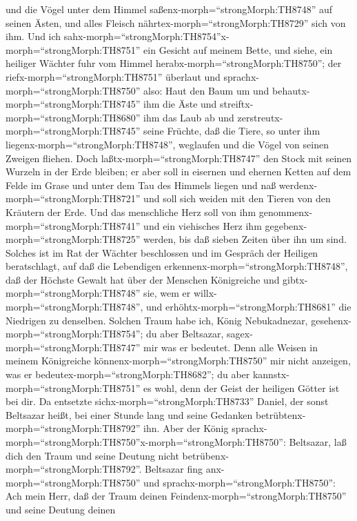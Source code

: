 und die Vögel unter dem Himmel saßenx-morph=``strongMorph:TH8748'' auf
seinen Ästen, und alles Fleisch nährtex-morph=``strongMorph:TH8729''
sich von ihm.  Und ich
sahx-morph=``strongMorph:TH8754''x-morph=``strongMorph:TH8751'' ein
Gesicht auf meinem Bette, und siehe, ein heiliger Wächter fuhr vom
Himmel herabx-morph=``strongMorph:TH8750'';  der
riefx-morph=``strongMorph:TH8751'' überlaut und
sprachx-morph=``strongMorph:TH8750'' also: Haut den Baum um und
behautx-morph=``strongMorph:TH8745'' ihm die Äste und
streiftx-morph=``strongMorph:TH8680'' ihm das Laub ab und
zerstreutx-morph=``strongMorph:TH8745'' seine Früchte, daß die Tiere, so
unter ihm liegenx-morph=``strongMorph:TH8748'', weglaufen und die Vögel
von seinen Zweigen fliehen.  Doch
laßtx-morph=``strongMorph:TH8747'' den Stock mit seinen Wurzeln in der
Erde bleiben; er aber soll in eisernen und ehernen Ketten auf dem Felde
im Grase und unter dem Tau des Himmels liegen und naß
werdenx-morph=``strongMorph:TH8721'' und soll sich weiden mit den Tieren
von den Kräutern der Erde.  Und das menschliche Herz soll
von ihm genommenx-morph=``strongMorph:TH8741'' und ein viehisches Herz
ihm gegebenx-morph=``strongMorph:TH8725'' werden, bis daß sieben Zeiten
über ihn um sind.  Solches ist im Rat der Wächter
beschlossen und im Gespräch der Heiligen beratschlagt, auf daß die
Lebendigen erkennenx-morph=``strongMorph:TH8748'', daß der Höchste
Gewalt hat über der Menschen Königreiche und
gibtx-morph=``strongMorph:TH8748'' sie, wem er
willx-morph=``strongMorph:TH8748'', und
erhöhtx-morph=``strongMorph:TH8681'' die Niedrigen zu denselben.
 Solchen Traum habe ich, König Nebukadnezar,
gesehenx-morph=``strongMorph:TH8754''; du aber Beltsazar,
sagex-morph=``strongMorph:TH8747'' mir was er bedeutet. Denn alle Weisen
in meinem Königreiche könnenx-morph=``strongMorph:TH8750'' mir nicht
anzeigen, was er bedeutex-morph=``strongMorph:TH8682''; du aber
kannstx-morph=``strongMorph:TH8751'' es wohl, denn der Geist der
heiligen Götter ist bei dir.  Da entsetzte
sichx-morph=``strongMorph:TH8733'' Daniel, der sonst Beltsazar heißt,
bei einer Stunde lang und seine Gedanken
betrübtenx-morph=``strongMorph:TH8792'' ihn. Aber der König
sprachx-morph=``strongMorph:TH8750''x-morph=``strongMorph:TH8750'':
Beltsazar, laß dich den Traum und seine Deutung nicht
betrübenx-morph=``strongMorph:TH8792''. Beltsazar fing
anx-morph=``strongMorph:TH8750'' und
sprachx-morph=``strongMorph:TH8750'': Ach mein Herr, daß der Traum
deinen Feindenx-morph=``strongMorph:TH8750'' und seine Deutung deinen

